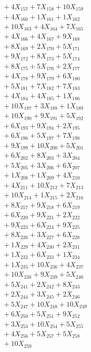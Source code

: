 \documentclass[a4paper,10pt]{article}
\begin{document}
{\begin{align}
&\;  + 4 X_{157} + 7 X_{158} + 10 X_{159} \\[0.5ex]\allowbreak
&\;  + 4 X_{160} + 1 X_{161} + 1 X_{162} \\[0.3ex]
&\;  + 10 X_{163} + 4 X_{164} + 7 X_{165} \\[0.3ex]
&\;  + 4 X_{166} + 4 X_{167} + 9 X_{168} \\[0.3ex]
&\;  + 8 X_{169} + 2 X_{170} + 5 X_{171} \\[0.3ex]
&\;  + 9 X_{172} + 8 X_{173} + 5 X_{174} \\[0.3ex]
&\;  + 8 X_{175} + 5 X_{176} + 2 X_{177} \\[0.3ex]
&\;  + 4 X_{178} + 9 X_{179} + 6 X_{180} \\[0.3ex]
&\;  + 5 X_{181} + 7 X_{182} + 7 X_{183} \\[0.3ex]
&\;  + 4 X_{184} + 4 X_{185} + 1 X_{186} \\[0.3ex]
&\;  + 10 X_{187} + 3 X_{188} + 1 X_{189} \\[0.5ex]\allowbreak
&\;  + 10 X_{190} + 9 X_{191} + 5 X_{192} \\[0.3ex]
&\;  + 6 X_{193} + 9 X_{194} + 2 X_{195} \\[0.3ex]
&\;  + 6 X_{196} + 5 X_{197} + 7 X_{198} \\[0.3ex]
&\;  + 9 X_{199} + 10 X_{200} + 5 X_{201} \\[0.3ex]
&\;  + 6 X_{202} + 8 X_{203} + 3 X_{204} \\[0.3ex]
&\;  + 5 X_{205} + 3 X_{206} + 6 X_{207} \\[0.3ex]
&\;  + 1 X_{208} + 1 X_{209} + 4 X_{210} \\[0.3ex]
&\;  + 4 X_{211} + 10 X_{212} + 7 X_{213} \\[0.3ex]
&\;  + 10 X_{214} + 1 X_{215} + 2 X_{216} \\[0.3ex]
&\;  + 8 X_{217} + 9 X_{218} + 6 X_{219} \\[0.5ex]\allowbreak
&\;  + 6 X_{220} + 9 X_{221} + 2 X_{222} \\[0.3ex]
&\;  + 9 X_{223} + 6 X_{224} + 9 X_{225} \\[0.3ex]
&\;  + 8 X_{226} + 3 X_{227} + 6 X_{228} \\[0.3ex]
&\;  + 1 X_{229} + 4 X_{230} + 2 X_{231} \\[0.3ex]
&\;  + 1 X_{232} + 6 X_{233} + 1 X_{234} \\[0.3ex]
&\;  + 1 X_{235} + 10 X_{236} + 4 X_{237} \\[0.3ex]
&\;  + 10 X_{238} + 9 X_{239} + 5 X_{240} \\[0.3ex]
&\;  + 5 X_{241} + 2 X_{242} + 8 X_{243} \\[0.3ex]
&\;  + 2 X_{244} + 3 X_{245} + 2 X_{246} \\[0.3ex]
&\;  + 5 X_{247} + 10 X_{248} + 10 X_{249} \\[0.5ex]\allowbreak
&\;  + 6 X_{250} + 5 X_{251} + 9 X_{252} \\[0.3ex]
&\;  + 3 X_{253} + 10 X_{254} + 5 X_{255} \\[0.3ex]
&\;  + 4 X_{256} + 5 X_{257} + 5 X_{258} \\[0.3ex]
&\;  + 10 X_{259}\nonumber
\end{align}
}
\end{document}
